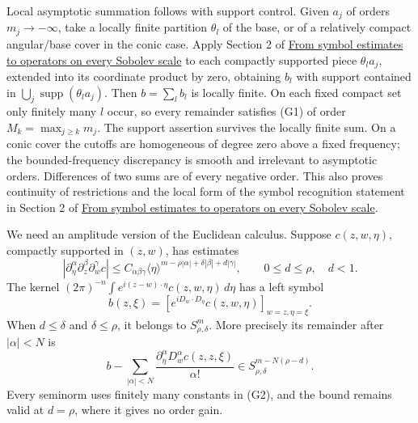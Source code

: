 \documentclass[
  11pt,
]{article}
\begin{document}
Local asymptotic summation follows with support control. Given \(a_j\)
of orders \(m_j\to-\infty\), take a locally finite partition
\(\theta_l\) of the base, or of a relatively compact angular/base cover
in the conic case. Apply Section 2 of
\href{euclidean-symbol-calculus.pdf}{From symbol estimates to operators
on every Sobolev scale} to each compactly supported piece
\(\theta_l a_j\), extended into its coordinate product by zero,
obtaining \(b_l\) with support contained in
\(\bigcup_j\operatorname{supp}(\theta_l a_j)\). Then \(b=\sum_l b_l\) is
locally finite. On each fixed compact set only finitely many \(l\)
occur, so every remainder satisfies (G1) of order
\(M_k=\max_{j\geq k}m_j\). The support assertion survives the locally
finite sum. On a conic cover the cutoffs are homogeneous of degree zero
above a fixed frequency; the bounded-frequency discrepancy is smooth and
irrelevant to asymptotic orders. Differences of two sums are of every
negative order. This also proves continuity of restrictions and the
local form of the symbol recognition statement in Section 2 of
\href{euclidean-symbol-calculus.pdf}{From symbol estimates to operators
on every Sobolev scale}.

We need an amplitude version of the Euclidean calculus. Suppose
\(c(z,w,\eta)\), compactly supported in \((z,w)\), has estimates \[
|\partial_\eta^\alpha\partial_z^\beta\partial_w^\gamma c|
\leq C_{\alpha\beta\gamma}
\langle\eta\rangle^{m-\rho|\alpha|+\delta|\beta|+d|\gamma|},
\qquad 0\leq d\leq\rho,\quad d<1.
\tag{G2}
\] The kernel \((2\pi)^{-n}\int e^{i(z-w)\cdot\eta}c(z,w,\eta)\,d\eta\)
has a left symbol \[
b(z,\xi)=\left[e^{iD_w\cdot D_\eta}c(z,w,\eta)\right]_{w=z,\eta=\xi}.
\tag{G3}
\] When \(d\leq\delta\) and \(\delta\leq\rho\), it belongs to
\(S^m_{\rho,\delta}\). More precisely its remainder after \(|\alpha|<N\)
is \[
b-\sum_{|\alpha|<N}\frac{\partial_\eta^\alpha D_w^\alpha c(z,z,\xi)}{\alpha!}
\in S^{m-N(\rho-d)}_{\rho,\delta}.
\tag{G4}
\] Every seminorm uses finitely many constants in (G2), and the bound
remains valid at \(d=\rho\), where it gives no order gain.
\end{document}

